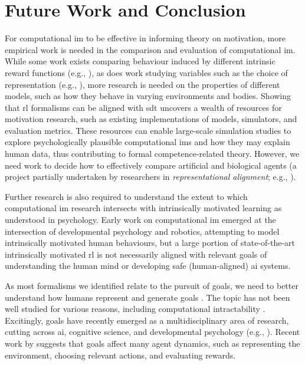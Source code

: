 \documentclass[10pt,letterpaper]{article}
\begin{document}
\section{Future Work and Conclusion}

For computational \gls{im} to be effective in informing theory on motivation, more empirical work is needed in the comparison and evaluation of computational \gls{im}. While some work exists comparing behaviour induced by different intrinsic reward functions (e.g., \citealp{santucci2012intrinsic,biehl2018expanding,linke2020adapting}), as does work studying variables such as the choice of representation (e.g., \citealp{burda2019large}), more research is needed on the properties of different models, such as how they behave in varying environments and bodies. Showing that \gls{rl} formalisms can be aligned with \gls{sdt} uncovers a wealth of resources for motivation research, such as existing implementations of models, simulators, and evaluation metrics. These resources can enable large-scale simulation studies to explore psychologically plausible computational \glspl{im} and how they may explain human data, thus contributing to formal competence-related theory. However, we need work to decide how to effectively compare artificial and biological agents (a project partially undertaken by researchers in \emph{representational alignment}; e.g., \citealp{sucholutsky2024getting}).

Further research is also required to understand the extent to which computational \gls{im} research intersects with intrinsically motivated learning as understood in psychology. Early work on computational \gls{im} emerged at the intersection of developmental psychology and robotics, attempting to model intrinsically motivated human behaviours, but a large portion of state-of-the-art intrinsically motivated \gls{rl} is not necessarily aligned with relevant goals of understanding the human mind or developing safe (human-aligned) \gls{ai} systems.

As most formalisms we identified relate to the pursuit of goals, we need to better understand how humans represent and generate goals \citep[p.~1]{colas2024what}. The topic has not been well studied for various reasons, including computational intractability \citep[p.~1]{byers2024modeling}. Excitingly, goals have recently emerged as a multidisciplinary area of research, cutting across \gls{ai}, cognitive science, and developmental psychology (e.g., \citealp{colas2022autotelic,molinaro2023a,chu2024in,davidson2024goals}). Recent work by \citet[p.~1150]{molinaro2023a} suggests that goals affect many agent dynamics, such as representing the environment, choosing relevant actions, and evaluating rewards.
\end{document}
